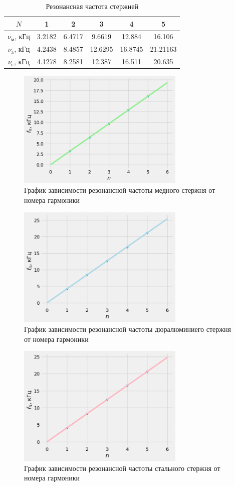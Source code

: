 \begin{table}[H]
        \centering
        \begin{tabular}{|c|c|c|c|c|c|}
            \hline
            $N$ & 1 & 2 & 3 & 4 & 5 \\ \hline
            $\nu_{\text{м}}$, кГц & 3.2182 & 6.4717 & 9.6619 & 12.884 & 16.106\\ \hline
            $\nu_{\text{a}}$, кГц & 4.2438 & 8.4857 & 12.6295 & 16.8745 & 21.21163\\ \hline
            $\nu_{\text{с}}$, кГц & 4.1278 & 8.2581 & 12.387 & 16.511 & 20.635\\ \hline
        \end{tabular}
        \caption{Резонансная частота стержней}
        \label{tab:my_labe_2}
\end{table}
\begin{figure}[H]
  \centering
  \includegraphics[width=8cm]{медь.png}
  \centering
  \caption{График зависимости резонансной частоты медного стержня от номера гармоники}
\end{figure}
\begin{figure}[H]
  \centering
  \includegraphics[width=8cm]{алюминий.png}
  \centering
  \caption{График зависимости резонансной частоты дюралюминиего стержня от номера гармоники}
\end{figure}
\begin{figure}[H]
  \centering
  \includegraphics[width=8cm]{сталь.png}
  \centering
  \caption{График зависимости резонансной частоты стального стержня от номера гармоники}
\end{figure}
